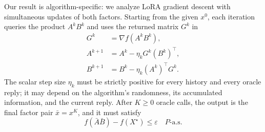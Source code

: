 \documentclass[10pt]{article}
\theoremstyle{definition}
\begin{document}
Our result is algorithm-specific: we analyze LoRA gradient descent with simultaneous updates of both factors. Starting from the given $x^0$, each iteration queries the product $A^kB^k$ and uses the returned matrix $G^k$ in
\[
\begin{aligned}
G^k&=\nabla f(A^kB^k),\\
A^{k+1}&=A^k-\eta_k G^k(B^k)^\top,\\
B^{k+1}&=B^k-\eta_k(A^k)^\top G^k.
\end{aligned}
\]
The scalar step size $\eta_k$ must be strictly positive for every history and every oracle reply; it may depend on the algorithm's randomness, its accumulated information, and the current reply. After $K\geq0$ oracle calls, the output is the final factor pair $\bar{x}=x^K$, and it must satisfy
\[
f(\bar{A}\bar{B})-f(X^\star)\leq\varepsilon
\quad P\text{-a.s.}
\]
\end{document}
